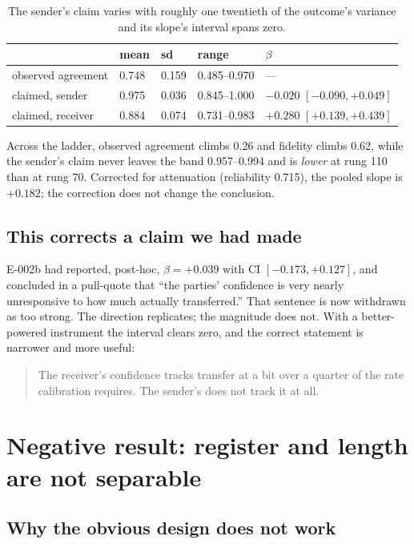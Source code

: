 \documentclass[11pt]{article}
\begin{document}
\begin{table}[h]
\centering
\begin{tabular}{lllll}
\toprule
 & mean & sd & range & $\beta$ \\
\midrule
observed agreement & 0.748 & 0.159 & 0.485--0.970 & --- \\
claimed, sender    & 0.975 & 0.036 & 0.845--1.000 & $-0.020$ \quad $[-0.090, +0.049]$ \\
claimed, receiver  & 0.884 & 0.074 & 0.731--0.983 & $+0.280$ \quad $[+0.139, +0.439]$ \\
\bottomrule
\end{tabular}
\caption{The sender's claim varies with roughly one twentieth of the outcome's
variance and its slope's interval spans zero.}
\end{table}

Across the ladder, observed agreement climbs 0.26 and fidelity climbs 0.62, while
the sender's claim never leaves the band 0.957--0.994 and is \emph{lower} at rung
110 than at rung 70. Corrected for attenuation (reliability 0.715), the pooled
slope is $+0.182$; the correction does not change the conclusion.

\subsection{This corrects a claim we had made}

E-002b had reported, post-hoc, $\beta = +0.039$ with CI $[-0.173, +0.127]$, and
concluded in a pull-quote that ``the parties' confidence is very nearly
unresponsive to how much actually transferred.'' That sentence is now withdrawn
as too strong. The direction replicates; the magnitude does not. With a
better-powered instrument the interval clears zero, and the correct statement is
narrower and more useful:

\begin{quote}
The receiver's confidence tracks transfer at a bit over a quarter of the rate
calibration requires. The sender's does not track it at all.
\end{quote}

\section{Negative result: register and length are not separable}
\label{sec:negative}

\subsection{Why the obvious design does not work}
\end{document}
